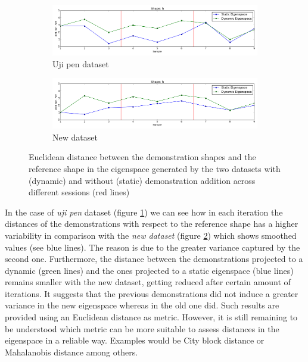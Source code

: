 \begin{figure}[h!]
        \centering
        \begin{subfigure}{0.9\textwidth}
                \includegraphics[width=1\textwidth]{figures/uji_pen.png}
                \caption{Uji pen dataset}
                \label{fig:ujipen}
        \end{subfigure}%

        \begin{subfigure}{0.9\textwidth}
                \includegraphics[width=1\textwidth]{figures/alexi.png}
                \caption{New dataset}
                \label{fig:alexi}
        \end{subfigure}
        \caption{Euclidean distance between the demonstration shapes and the reference shape in the eigenspace generated by the two datasets with (dynamic) and without (static) demonstration addition across different sessions (red lines)}
        \label{fig:datasets}
\end{figure}

In the case of \textit{uji pen} dataset (figure \ref{fig:ujipen}) we can see how in each iteration the distances of the demonstrations with respect to the reference shape has a higher variability in comparison with the \textit{new dataset} (figure \ref{fig:alexi}) which shows smoothed values (see blue lines). The reason is due to the greater variance captured by the second one. 
Furthermore, the distance between the demonstrations projected to a dynamic (green lines) and the ones projected to a static eigenspace (blue lines) remains smaller with the new dataset, getting reduced after certain amount of iterations. It suggests that the previous demonstrations did not induce a greater variance in the new eigenspace whereas in the old one did. Such results are provided using an Euclidean distance as metric. However, it is still remaining to be understood which metric can be more suitable to assess distances in the eigenspace in a reliable way. Examples would be City block distance or Mahalanobis distance among others.

